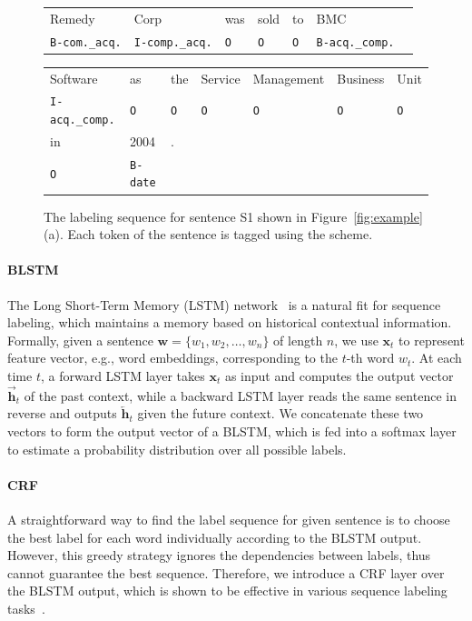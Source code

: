 \begin{figure}
\centering
\scriptsize
\begin{tabular}{lllllll}
\toprule
Remedy & Corp & was & sold & to & BMC & \\
\rowcolor{Gray} \texttt{B-com.\_acq.} & \texttt{I-comp.\_acq.} & \texttt{O} & \texttt{O} & \texttt{O} & \texttt{B-acq.\_comp.} &\\
\end{tabular}
\begin{tabular}{lllllll}
Software & as & the & Service & Management & Business & Unit\\
\rowcolor{Gray} \texttt{I-acq.\_comp.} & \texttt{O} & \texttt{O} & \texttt{O} & \texttt{O} & \texttt{O} & \texttt{O}\\
in & 2004 &.&&&&\\
\rowcolor{Gray} \texttt{O} & \texttt{B-date} &&&&&\\
\bottomrule
\end{tabular}

\caption{The labeling sequence for sentence S1 shown in Figure~\ref{fig:example} (a). Each token of the sentence is tagged using the \BIO
scheme. \label{fig:ls}}

\end{figure}


\paragraph{BLSTM}
The Long Short-Term Memory (LSTM) network~\cite{hochreiter1997long} is a natural fit for sequence labeling, which maintains a memory based
on historical contextual information. Formally, given a sentence $\bm{w} = \{w_1, w_2, \dots, w_n\}$ of length $n$, we use $\textbf{x}_t$
to represent feature vector, e.g., word embeddings, corresponding to the $t$-th word $w_t$. At each time $t$, a forward LSTM layer takes
$\textbf{x}_t$ as input and computes the output vector $\overrightarrow{\textbf{h}}_t$ of the past context, while a backward LSTM layer
reads the same sentence in reverse and outputs $\overleftarrow{\textbf{h}}_t$ given the future context. We concatenate these two vectors to
form the output vector of a BLSTM, which is fed into a softmax layer to estimate a probability distribution over all possible labels.

\paragraph{CRF}
A straightforward way to find the label sequence for given sentence is to choose the
best label for each word individually according to the BLSTM output.
However, this greedy strategy ignores the dependencies between labels, thus cannot guarantee the best sequence.  %
Therefore, we introduce a CRF layer over the BLSTM output, which is shown to be effective in various sequence labeling tasks~\cite{collobert2011natural,huang2015bidirectional}. %

